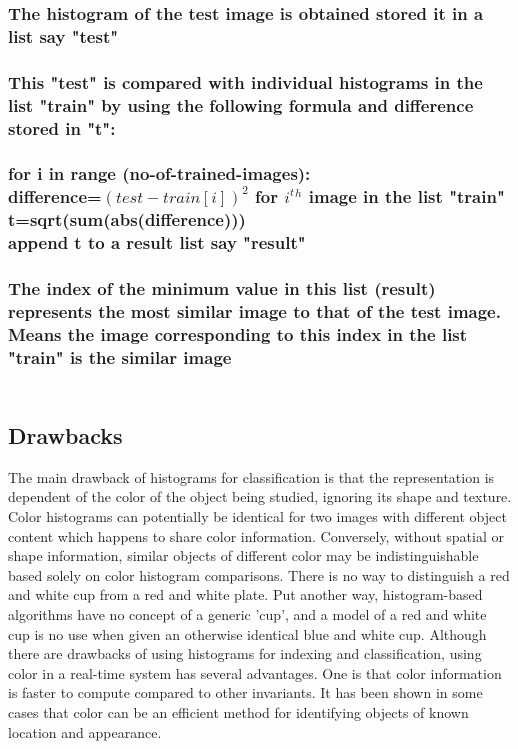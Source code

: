 \documentclass[10pt,a4paper]{article}
\newcommand{\tab}{\hspace*{4em}}
\begin{document}
\subsubsection{The histogram of the test image is obtained stored it in a list say "test"}
\subsubsection{This "test" is compared with individual histograms in the list "train" by using the following formula and difference stored in "t":\\ \\
			for i in range (no-of-trained-images): \\ 
			\tab difference=$(test-train[i])^{2}$ for $i^t$$^h$  image in the list "train" \\			
			\tab t=sqrt(sum(abs(difference))) \\
			\tab append t to a result list say "result" \\ }
			
				
\subsubsection{The index of the minimum value in this list (result) represents the most similar image to that of the test image. Means the image corresponding to this index in the list "train" is the similar image\\ \\ } 
			 
\subsection{Drawbacks}
The main drawback of histograms for classification is that the representation is dependent of the color of the object being studied, ignoring its shape and texture. Color histograms can potentially be identical for two images with different object content which happens to share color information. Conversely, without spatial or shape information, similar objects of different color may be indistinguishable based solely on color histogram comparisons. There is no way to distinguish a red and white cup from a red and white plate. Put another way, histogram-based algorithms have no concept of a generic 'cup', and a model of a red and white cup is no use when given an otherwise identical blue and white cup.
 Although there are drawbacks of using histograms for indexing and classification, using color in a real-time system has several advantages. One is that color information is faster to compute compared to other invariants. It has been shown in some cases that color can be an efficient method for identifying objects of known location and appearance.
\end{document}
